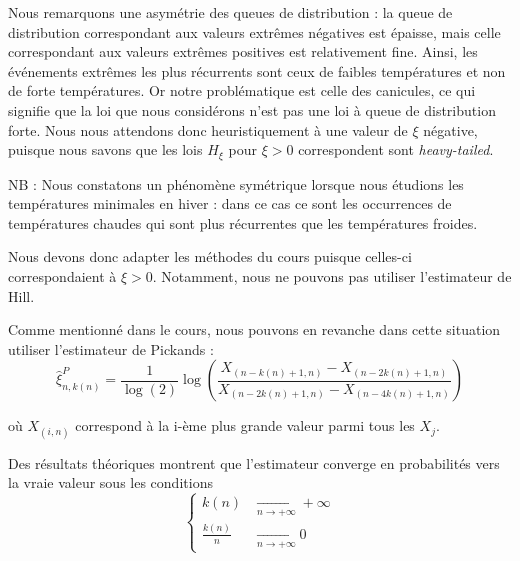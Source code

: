 \documentclass[../report.tex]{subfiles}
\begin{document}
\par Nous remarquons une asymétrie des queues de distribution : la queue de distribution correspondant aux valeurs extrêmes négatives est épaisse, mais celle correspondant aux valeurs extrêmes positives est relativement fine. Ainsi, les événements extrêmes les plus récurrents sont ceux de faibles températures et non de forte températures. Or notre problématique est celle des canicules, ce qui signifie que la loi que nous considérons n'est pas une loi à queue de distribution forte. Nous nous attendons donc heuristiquement à une valeur de $\xi$ négative, puisque nous savons que les lois $H_{\xi}$ pour $\xi > 0$ correspondent sont \emph{heavy-tailed}.

\par NB : Nous constatons un phénomène symétrique lorsque nous étudions les températures minimales en hiver : dans ce cas ce sont les occurrences de températures chaudes qui sont plus récurrentes que les températures froides.

\par Nous devons donc adapter les méthodes du cours puisque celles-ci correspondaient à $\xi > 0$. Notamment, nous ne pouvons pas utiliser l'estimateur de Hill.

\par Comme mentionné dans le cours, nous pouvons en revanche dans cette situation utiliser l'estimateur de Pickands :
\begin{equation}
  \tag{Estimateur de Pickands}
  \hat{\xi}_{n, k \left( n \right)}^{P} = \frac{1}{\log \left( 2 \right)} \log \left( \frac{ X_{\left( n - k \left( n \right) + 1, n\right)} - X_{\left( n - 2 k \left( n \right) + 1, n\right)}}{X_{\left( n - 2 k \left( n \right) + 1, n\right)} - X_{\left( n - 4 k \left( n \right) + 1, n\right)}} \right)
\end{equation}

où $X_{\left(i, n \right)}$ correspond à la i-ème plus grande valeur parmi tous les $X_j$.

\par Des résultats théoriques montrent que l'estimateur converge en probabilités vers la vraie valeur sous les conditions 
\begin{displaymath}
	\begin{cases}
	k \left( n \right) &\xrightarrow[n \to + \infty]{} + \infty \\
	\frac{k \left( n \right)}{n} &\xrightarrow[n \to + \infty]{} 0
	\end{cases}
\end{displaymath}
\end{document}
